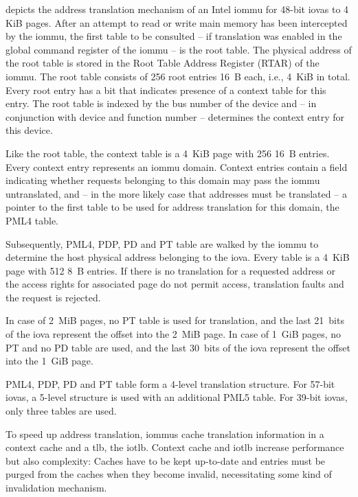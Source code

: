  depicts the address translation mechanism of an Intel
\ac{iommu} for 48-bit \acp{iova} to 4 KiB pages. After an attempt to read or
write main memory has been intercepted by the \ac{iommu}, the first table to be
consulted -- if translation was enabled in the global command register of the
\ac{iommu} -- is the root table. The physical address of the root table is
stored in the Root Table Address Register (RTAR) of the \ac{iommu}. The root
table consists of 256 root entries 16~B each, i.e., 4~KiB in total. Every root
entry has a bit that indicates presence of a context table for this entry. The
root table is indexed by the bus number of the device and -- in conjunction with
device and function number -- determines the context entry for this device.

Like the root table, the context table is a 4~KiB page with 256 16~B entries.
Every context entry represents an \ac{iommu} domain. Context entries contain a
field indicating whether requests belonging to this domain may pass the
\ac{iommu} untranslated, and -- in the more likely case that addresses must be
translated -- a pointer to the first table to be used for address translation
for this domain, the PML4 table.

Subsequently, PML4, PDP, PD and PT table are walked by the \ac{iommu} to
determine the host physical address belonging to the \ac{iova}. Every
table is a 4~KiB page with 512 8~B entries. If there is no translation for a
requested address or the access rights for associated page do not permit access,
translation faults and the request is rejected.

In case of 2~MiB pages, no PT table is used for translation, and the last
21~bits of the \ac{iova} represent the offset into the 2~MiB page. In case of
1~GiB pages, no PT and no PD table are used, and the last 30~bits of the
\ac{iova} represent the offset into the 1~GiB page.

PML4, PDP, PD and PT table form a 4-level translation structure. For 57-bit
\acp{iova}, a 5-level structure is used with an additional PML5 table. For
39-bit \acp{iova}, only three tables are used.

To speed up address translation, \acp{iommu} cache translation information in a
context cache and a \ac{tlb}, the \ac{iotlb}. Context cache and \ac{iotlb}
increase performance but also complexity: Caches have to be kept up-to-date and
entries must be purged from the caches when they become invalid, necessitating
some kind of invalidation mechanism.


